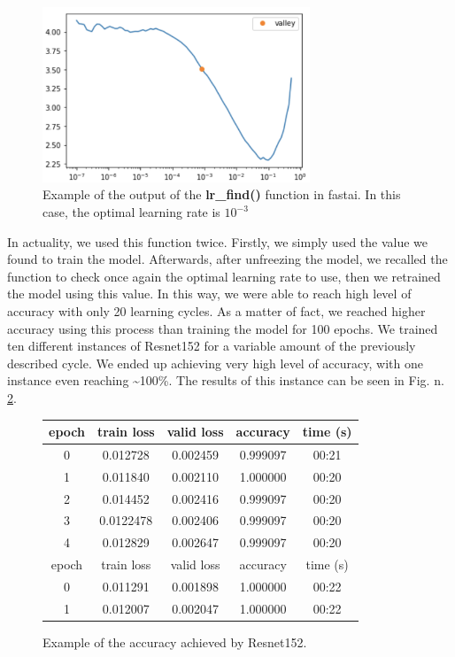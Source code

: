 \documentclass[english]{lni}
\begin{document}
\begin{figure}[h]
    \centering
    \includegraphics[width = 8cm]{img/lrfind.png}
    \caption{Example of the output of the \textbf{lr\_find()} function in fastai. In this case, the optimal learning rate is $10^{-3}$}
    \label{fig:lrfind}
\end{figure}
In actuality, we used this function twice. Firstly, we simply used the value we found to train the model. Afterwards, after unfreezing the model, we recalled the function to check once again the optimal learning rate to use, then we retrained the model using this value. In this way, we were able to reach high level of accuracy with only 20 learning cycles. As a matter of fact, we reached higher accuracy using this process than training the model for 100 epochs. We trained ten different instances of Resnet152 for a variable amount of the previously described cycle. We ended up achieving very high level of accuracy, with one instance even reaching \textasciitilde100\%. The results of this instance can be seen in Fig. n.  \ref{tab:results}. \\



\begin{figure}[ht]
\centering
\begin{tabular}{|c|c|c|c|c|}
\hline
    epoch & train loss & valid loss &accuracy& time (s)\\
\hline
    0&0.012728&0.002459&0.999097&00:21\\
    1&0.011840&0.002110&1.000000&00:20\\
    2&0.014452&0.002416&0.999097&00:20\\
    3&0.0122478&0.002406&0.999097&00:20\\
    4&0.012829&0.002647&0.999097&00:20\\
\hline
    epoch & train loss & valid loss &accuracy& time (s)\\
\hline
    0&0.011291&0.001898&1.000000&00:22\\
    1&0.012007&0.002047&1.000000&00:22\\
\hline
\end{tabular}
\caption{Example of the accuracy achieved by Resnet152.}
\label{tab:results}
\end{figure}
\end{document}
